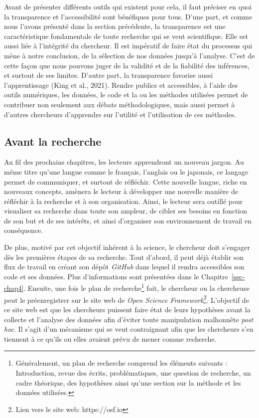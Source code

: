 \documentclass[
  letterpaper,
  DIV=11,
  numbers=noendperiod,
  oneside]{scrreprt}
\begin{document}
Avant de présenter différents outils qui existent pour cela, il faut
préciser en quoi la transparence et l'accessibilité sont bénéfiques pour
tous. D'une part, et comme nous l'avons présenté dans la section
précédente, la transparence est une caractéristique fondamentale de
toute recherche qui se veut scientifique. Elle est aussi liée à
l'intégrité du chercheur. Il est impératif de faire état du processus
qui mène à notre conclusion, de la sélection de nos données jusqu'à
l'analyse. C'est de cette façon que nous pouvons juger de la validité et
de la fiabilité des inférences, et surtout de ses limites. D'autre part,
la transparence favorise aussi l'apprentissage (King et al., 2021).
Rendre publics et accessibles, à l'aide des outils numériques, les
données, le code et la ou les méthodes utilisées permet de contribuer
non seulement aux débats méthodologiques, mais aussi permet à d'autres
chercheurs d'apprendre sur l'utilité et l'utilisation de ces méthodes.

\hypertarget{avant-la-recherche}{%
\subsection{Avant la recherche}\label{avant-la-recherche}}

Au fil des prochains chapitres, les lecteurs apprendront un nouveau
jargon. Au même titre qu'une langue comme le français, l'anglais ou le
japonais, ce langage permet de communiquer, et surtout de réfléchir.
Cette nouvelle langue, riche en nouveaux concepts, amènera le lecteur à
développer une nouvelle manière de réfléchir à la recherche et à son
organisation. Ainsi, le lecteur sera outillé pour visualiser sa
recherche dans toute son ampleur, de cibler ses besoins en fonction de
son but et de ses intérêts, et ainsi d'organiser son environnement de
travail en conséquence.

De plus, motivé par cet objectif inhérent à la science, le chercheur
doit s'engager dès les premières étapes de sa recherche. Tout d'abord,
il peut déjà établir son flux de travail en créant son dépôt
\emph{GitHub} dans lequel il rendra accessibles son code et ses données.
Plus d'informations sont présentées dans le Chapitre~\ref{sec-chap4}.
Ensuite, une fois le plan de recherche\footnote{Généralement, un plan de
  recherche comprend les éléments suivants : Introduction, revue des
  écrits, problématiques, une question de recherche, un cadre théorique,
  des hypothèses ainsi qu'une section sur la méthode et les données
  utilisées.} fait, le chercheur ou la chercheuse peut le préenregistrer
sur le site web de \emph{Open Science Framework}\footnote{Lien vers le
  site web: https://osf.io}. L'objectif de ce site web est que les
chercheurs puissent faire état de leurs hypothèses avant la collecte et
l'analyse des données afin d'éviter toute manipulation malhonnête
\emph{post hoc}. Il s'agit d'un mécanisme qui se veut contraignant afin
que les chercheurs s'en tiennent à ce qu'ils ou elles avaient prévu de
mener comme recherche.
\end{document}

